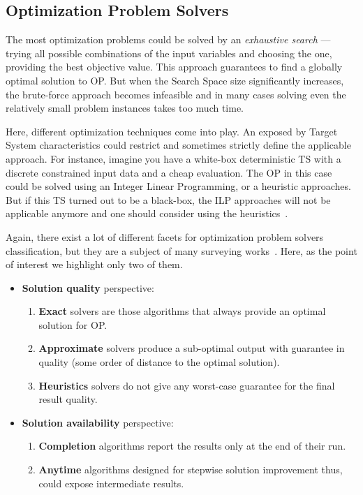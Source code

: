 \subsection{Optimization Problem Solvers}\label{BG: subsection OP Solvers}
The most optimization problems could be solved by an \emph{exhaustive search} — trying all possible combinations of the input variables and choosing the one, providing the best objective value. This approach guarantees to find a globally optimal solution to OP. But when the Search Space size significantly increases, the brute-force approach becomes infeasible and in many cases solving even the relatively small problem instances takes too much time.

Here, different optimization techniques come into play. An exposed by Target System characteristics could restrict and sometimes strictly define the applicable approach.
For instance, imagine you have a white-box deterministic TS with a discrete constrained input data and a cheap evaluation. The OP in this case could be solved using an Integer Linear Programming, or a heuristic approaches. But if this TS turned out to be a black-box, the ILP approaches will not be applicable anymore and one should consider using the heuristics~\cite{biegler2004retrospective}.

Again, there exist a lot of different facets for optimization problem solvers classification, but they are a subject of many surveying works~\cite{junger2003combinatorial,biegler2004retrospective,festa2014brief}. Here, as the point of interest we highlight only two of them.

\begin{itemize}[itemsep=8pt]
	\item \textbf{Solution quality} perspective:
	\begin{enumerate}
		\item \textbf{Exact} solvers are those algorithms that always provide an optimal solution for OP.
		\item \textbf{Approximate} solvers produce a sub-optimal output with guarantee in quality (some order of distance to the optimal solution).
		\item \textbf{Heuristics} solvers do not give any worst-case guarantee for the final result quality.
	\end{enumerate}
	
	\item \textbf{Solution availability} perspective:
	\begin{enumerate}
		\item \textbf{Completion} algorithms report the results only at the end of their run.
		\item \textbf{Anytime} algorithms designed for stepwise solution improvement thus, could expose intermediate results.
	\end{enumerate}
\end{itemize}

